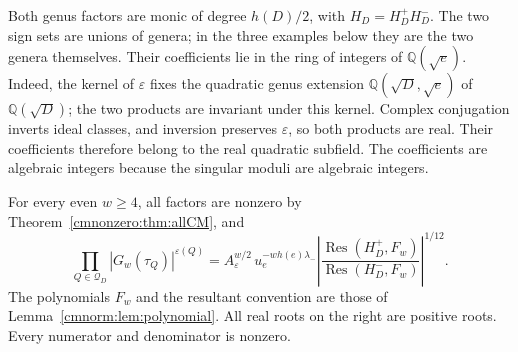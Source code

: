 Both genus factors are monic of degree $h(D)/2$, with
$H_D=H_D^+H_D^-$. The two sign sets are unions of genera; in the
three examples below they are the two genera themselves.
Their coefficients lie in the ring of integers of
$\mathbb Q(\sqrt e)$. Indeed, the kernel of $\varepsilon$ fixes the
quadratic genus extension $\mathbb Q(\sqrt D,\sqrt e)$ of
$\mathbb Q(\sqrt D)$; the two products are invariant under this kernel.
Complex conjugation inverts ideal classes, and inversion preserves
$\varepsilon$, so both products are real. Their coefficients therefore
belong to the real quadratic subfield. The coefficients are algebraic
integers because the singular moduli are algebraic integers.

\begin{theorem}
\label{cmgenus:thm:allweights}
For every even $w\geq4$, all factors are nonzero by
Theorem~\ref{cmnonzero:thm:allCM}, and
\begin{equation}
 \prod_{Q\in\mathcal Q_D}|G_w(\tau_Q)|^{\varepsilon(Q)}
 =A_\varepsilon^{w/2}\,
   u_e^{-w h(e)\lambda_-}
   \left|
    \frac{\operatorname{Res}(H_D^+,F_w)}
         {\operatorname{Res}(H_D^-,F_w)}
   \right|^{1/12}.
 \label{cmgenus:eq:allweights}
\end{equation}
The polynomials $F_w$ and the resultant convention are those of
Lemma~\ref{cmnorm:lem:polynomial}. All real roots on the right are
positive roots. Every numerator and denominator is nonzero.
\end{theorem}

